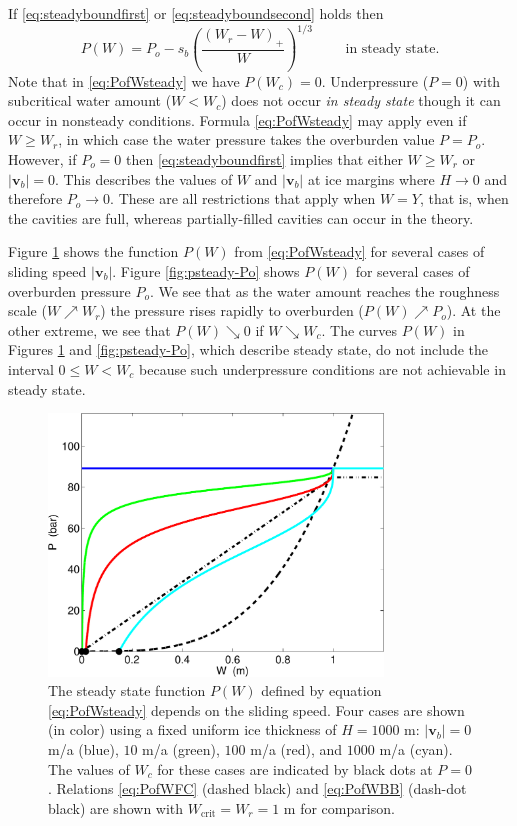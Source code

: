 \documentclass[11pt,final]{amsart}
\newcommand\bv{\mathbf{v}}
\begin{document}
If \eqref{eq:steadyboundfirst} or \eqref{eq:steadyboundsecond} holds then
\begin{equation}
P(W) = P_o - s_b \left(\frac{(W_r - W)_+}{W}\right)^{1/3} \qquad \text{ in steady state}.  \label{eq:PofWsteady}
\end{equation}
Note that in \eqref{eq:PofWsteady} we have $P(W_c)=0$.  Underpressure ($P=0$) with subcritical water amount ($W<W_c$) does not occur \emph{in steady state} though it can occur in nonsteady conditions.  Formula \eqref{eq:PofWsteady} may apply even if $W\ge W_r$, in which case the water pressure takes the overburden value $P = P_o$.  However, if $P_o=0$ then \eqref{eq:steadyboundfirst} implies that either $W\ge W_r$ or $|\bv_b|=0$.  This describes the values of $W$ and $|\bv_b|$ at ice margins where $H\to 0$ and therefore $P_o\to 0$.  These are all restrictions that apply when $W=Y$, that is, when the cavities are full, whereas partially-filled cavities can occur in the \cite{Schoofetal2012} theory.

\newcommand{\upto}{ \!\!\nearrow\! }
\newcommand{\downto}{ \!\searrow\! }
Figure \ref{fig:psteady-vb} shows the function $P(W)$ from \eqref{eq:PofWsteady} for several cases of sliding speed $|\bv_b|$.  Figure \ref{fig:psteady-Po} shows $P(W)$ for several cases of overburden pressure $P_o$.  We see that as the water amount reaches the roughness scale ($W\upto W_r$) the pressure rises rapidly to overburden ($P(W) \upto P_o$).  At the other extreme, we see that $P(W) \downto 0$ if $W \downto W_c$.  The curves $P(W)$ in Figures \ref{fig:psteady-vb} and \ref{fig:psteady-Po}, which describe steady state, do not include the interval $0\le W < W_c$ because such underpressure conditions are not achievable in steady state.

\begin{figure}[ht]
\includegraphics[width=3.5in,keepaspectratio=true]{psteady-vb}
\medskip
\caption{The steady state function $P(W)$ defined by equation \eqref{eq:PofWsteady} depends on the sliding speed.  Four cases are shown (in color) using a fixed uniform ice thickness of $H=1000$ m: $|\bv_b|=0$ m/a (blue), $10$ m/a (green), $100$ m/a (red), and $1000$ m/a (cyan).  The values of $W_c$ for these cases are indicated by black dots at $P=0$.  Relations \eqref{eq:PofWFC} (dashed black) and \eqref{eq:PofWBB} (dash-dot black) are shown with $W_{\text{crit}}=W_r=1$ m for comparison.}
\label{fig:psteady-vb}
\end{figure}
\end{document}
